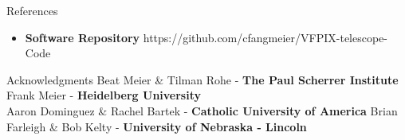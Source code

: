 \documentclass[final]{beamer}
\newlength{\onecolwide}
\begin{document}
\begin{frame}[t]
\begin{columns}[t]
\begin{column}{\onecolwide}
\begin{block}{References}
\begin{itemize}
        \item \textbf{Software Repository} https://github.com/cfangmeier/VFPIX-telescope-Code
      \end{itemize}
    \end{block}
    \vspace{-0.17in}
    \begin{block}{Acknowledgments} 
      \footnotesize
      Beat Meier \& Tilman Rohe \-- \textbf{The Paul Scherrer Institute}\\
      Frank Meier \-- \textbf{Heidelberg University}\\
      Aaron Dominguez \& Rachel Bartek \-- \textbf{Catholic University of America}
      Brian Farleigh \& Bob Kelty \-- \textbf{University of Nebraska \-- Lincoln}
    \end{block}
  \end{column}
\end{columns}

\end{frame} %
\end{document}
